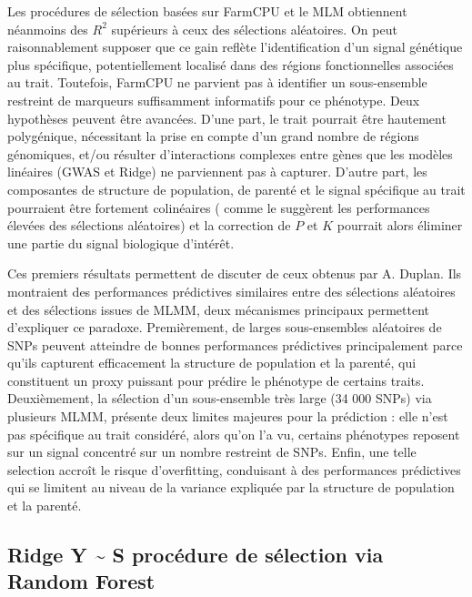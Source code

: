 \documentclass[
  11pt,
  letterpaper,
  DIV=11,
  numbers=noendperiod]{scrartcl}
\begin{document}
Les procédures de sélection basées sur FarmCPU et le MLM obtiennent
néanmoins des \(R^2\) supérieurs à ceux des sélections aléatoires. On
peut raisonnablement supposer que ce gain reflète l'identification d'un
signal génétique plus spécifique, potentiellement localisé dans des
régions fonctionnelles associées au trait. Toutefois, FarmCPU ne
parvient pas à identifier un sous-ensemble restreint de marqueurs
suffisamment informatifs pour ce phénotype. Deux hypothèses peuvent être
avancées. D'une part, le trait pourrait être hautement polygénique,
nécessitant la prise en compte d'un grand nombre de régions génomiques,
et/ou résulter d'interactions complexes entre gènes que les modèles
linéaires (GWAS et Ridge) ne parviennent pas à capturer. D'autre part,
les composantes de structure de population, de parenté et le signal
spécifique au trait pourraient être fortement colinéaires ( comme le
suggèrent les performances élevées des sélections aléatoires) et la
correction de \(P\) et \(K\) pourrait alors éliminer une partie du
signal biologique d'intérêt.

Ces premiers résultats permettent de discuter de ceux obtenus par A.
Duplan. Ils montraient des performances prédictives similaires entre des
sélections aléatoires et des sélections issues de MLMM, deux mécanismes
principaux permettent d'expliquer ce paradoxe. Premièrement, de larges
sous-ensembles aléatoires de SNPs peuvent atteindre de bonnes
performances prédictives principalement parce qu'ils capturent
efficacement la structure de population et la parenté, qui constituent
un proxy puissant pour prédire le phénotype de certains traits.
Deuxièmement, la sélection d'un sous-ensemble très large (34 000 SNPs)
via plusieurs MLMM, présente deux limites majeures pour la prédiction :
elle n'est pas spécifique au trait considéré, alors qu'on l'a vu,
certains phénotypes reposent sur un signal concentré sur un nombre
restreint de SNPs. Enfin, une telle selection accroît le risque
d'overfitting, conduisant à des performances prédictives qui se limitent
au niveau de la variance expliquée par la structure de population et la
parenté.

\hypertarget{ridge-y-s-procuxe9dure-de-suxe9lection-via-random-forest}{%
\subsection{Ridge Y \textasciitilde{} S procédure de sélection via
Random
Forest}\label{ridge-y-s-procuxe9dure-de-suxe9lection-via-random-forest}}
\end{document}
